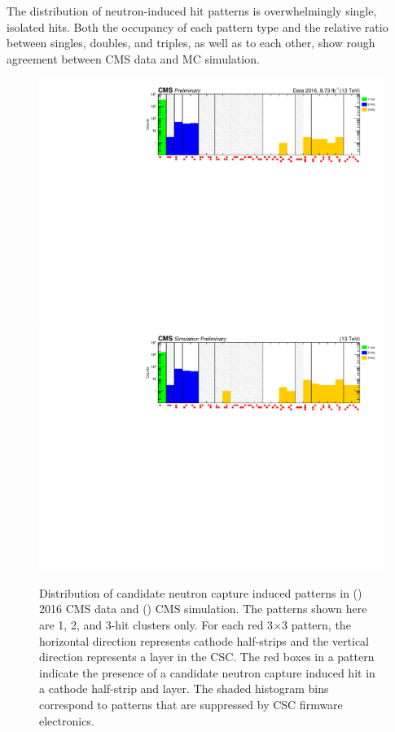 The distribution of neutron-induced hit patterns is overwhelmingly single, isolated hits. Both the occupancy of each pattern type and the relative ratio between singles, doubles, and triples, as well as to each other, show rough agreement between CMS data and MC simulation.

\begin{figure}[!h]
	\centering
	\includegraphics[width=\fullFigWidth]{figures/neutron/BGPatterns_P5.pdf}
	\includegraphics[width=\fullFigWidth]{figures/neutron/BGPatterns_MC.pdf}
	\caption{Distribution of candidate neutron capture induced patterns in () 2016 CMS data and () CMS simulation. The patterns shown here are 1, 2, and 3-hit clusters only. For each red 3$\times$3 pattern, the horizontal direction represents cathode half-strips and the vertical direction represents a layer in the CSC. The red boxes in a pattern indicate the presence of a candidate neutron capture induced hit in a cathode half-strip and layer. The shaded histogram bins correspond to patterns that are suppressed by CSC firmware electronics.}
	\label{fig:pattern}
\end{figure}

